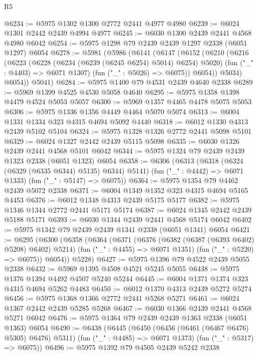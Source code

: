 \begin{lexlean}{R5}
\begin{coremodule}
@6234 := @5975 @1302 @1300 @2772 @2441 @4977 @4980
@6239 := @6024 @1301 @2442 @2439 @4994 @4977
@6245 := @6030 @1300 @2439 @2441 @4568 @4980 @6042
@6254 := @5975 @1298 @79 @2439 @2439 @1297 @2338 (@6051 @1297) @6054
@6278 := @5981
    (@5986
      (@6141
        (@6147
          (@6152
            (@6210
              (@6216
                (@6223
                  (@6228 (@6234 (@6239 (@6245 @6254) @5014) @6254) @5020)
                  (fun ("_" : @4403) => @6071 @1307)
                  (fun ("_" : @5026) => @6075))
                @6054))
            @5034)
          @6054))
      @5041)
@6284 := @5975 @1400 @79 @4531 @2439 @4640 @2338
@6289 := @5969 @1399 @4525 @4530 @5058 @4640
@6295 := @5975 @1358 @1398 @4479 @4524 @5053 @5057
@6300 := @5969 @1357 @4465 @4478 @5075 @5053
@6306 := @5975 @1336 @1356 @4449 @4464 @5070 @5074
@6313 := @6004 @1331 @1334 @323 @4315 @4694 @5092 @4440
@6318 := @6012 @1330 @4313 @2439 @5102 @5104
@6324 := @5975 @1328 @1326 @2772 @2441 @5098 @5101
@6329 := @6024 @1327 @2442 @2439 @5115 @5098
@6335 := @6030 @1326 @2439 @2441 @4568 @5101 @6042
@6344 := @5975 @1324 @79 @2439 @2439 @1323 @2338 (@6051 @1323) @6054
@6358 := @6306
    (@6313
      (@6318 (@6324 (@6329 (@6335 @6344) @5135) @6344) @5141)
      (fun ("_" : @4442) => @6071 @1333)
      (fun ("_" : @5147) => @6075))
@6364 := @5975 @1354 @79 @4462 @2439 @5072 @2338
@6371 := @6004 @1349 @1352 @323 @4315 @4694 @5165 @4453
@6376 := @6012 @1348 @4313 @2439 @5175 @5177
@6382 := @5975 @1346 @1344 @2772 @2441 @5171 @5174
@6387 := @6024 @1345 @2442 @2439 @5188 @5171
@6393 := @6030 @1344 @2439 @2441 @4568 @5174 @6042
@6402 := @5975 @1342 @79 @2439 @2439 @1341 @2338 (@6051 @1341) @6054
@6421 := @6295
    (@6300
      (@6358
        (@6364
          (@6371
            (@6376 (@6382 (@6387 (@6393 @6402) @5208) @6402) @5214)
            (fun ("_" : @4455) => @6071 @1351)
            (fun ("_" : @5220) => @6075))
          @6054))
      @5228)
@6427 := @5975 @1396 @79 @4522 @2439 @5055 @2338
@6432 := @5969 @1395 @4508 @4521 @5245 @5055
@6438 := @5975 @1376 @1394 @4492 @4507 @5240 @5244
@6445 := @6004 @1371 @1374 @323 @4315 @4694 @5262 @4483
@6450 := @6012 @1370 @4313 @2439 @5272 @5274
@6456 := @5975 @1368 @1366 @2772 @2441 @5268 @5271
@6461 := @6024 @1367 @2442 @2439 @5285 @5268
@6467 := @6030 @1366 @2439 @2441 @4568 @5271 @6042
@6476 := @5975 @1364 @79 @2439 @2439 @1363 @2338 (@6051 @1363) @6054
@6490 := @6438
    (@6445
      (@6450 (@6456 (@6461 (@6467 @6476) @5305) @6476) @5311)
      (fun ("_" : @4485) => @6071 @1373)
      (fun ("_" : @5317) => @6075))
@6496 := @5975 @1392 @79 @4505 @2439 @5242 @2338

\end{coremodule}
\end{lexlean}
